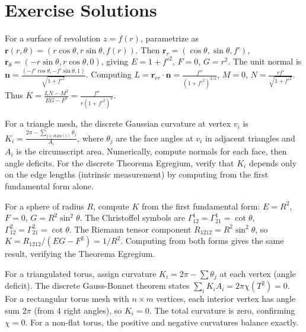 \section{Exercise Solutions}

\begin{solution}
For a surface of revolution $z = f(r)$, parametrize as $\mathbf{r}(r,\theta) = (r\cos\theta, r\sin\theta, f(r))$. Then $\mathbf{r}_r = (\cos\theta, \sin\theta, f')$, $\mathbf{r}_\theta = (-r\sin\theta, r\cos\theta, 0)$, giving $E = 1 + f'^2$, $F = 0$, $G = r^2$. The unit normal is $\mathbf{n} = \frac{(-f'\cos\theta, -f'\sin\theta, 1)}{\sqrt{1+f'^2}}$. Computing $L = \mathbf{r}_{rr} \cdot \mathbf{n} = \frac{f''}{(1+f'^2)^{3/2}}$, $M = 0$, $N = \frac{r f'}{\sqrt{1+f'^2}}$. Thus $K = \frac{LN - M^2}{EG-F^2} = \frac{f''}{r(1+f'^2)^2}$.
\end{solution}

\begin{solution}
For a triangle mesh, the discrete Gaussian curvature at vertex $v_i$ is $K_i = \frac{2\pi - \sum_{j \in \text{stars}(i)} \theta_j}{A_i}$, where $\theta_j$ are the face angles at $v_i$ in adjacent triangles and $A_i$ is the circumscript area. Numerically, compute normals for each face, then angle deficits. For the discrete Theorema Egregium, verify that $K_i$ depends only on the edge lengths (intrinsic measurement) by computing from the first fundamental form alone.
\end{solution}

\begin{solution}
For a sphere of radius $R$, compute $K$ from the first fundamental form: $E = R^2$, $F = 0$, $G = R^2\sin^2\theta$. The Christoffel symbols are $\Gamma^1_{12} = \Gamma^1_{21} = \cot\theta$, $\Gamma^2_{12} = \Gamma^2_{21} = \cot\theta$. The Riemann tensor component $R_{1212} = R^2\sin^2\theta$, so $K = R_{1212}/(EG-F^2) = 1/R^2$. Computing from both forms gives the same result, verifying the Theorema Egregium.
\end{solution}

\begin{solution}
For a triangulated torus, assign curvature $K_i = 2\pi - \sum \theta_j$ at each vertex (angle deficit). The discrete Gauss-Bonnet theorem states $\sum_i K_i A_i = 2\pi\chi(T^2) = 0$. For a rectangular torus mesh with $n \times m$ vertices, each interior vertex has angle sum $2\pi$ (from 4 right angles), so $K_i = 0$. The total curvature is zero, confirming $\chi = 0$. For a non-flat torus, the positive and negative curvatures balance exactly.
\end{solution}
